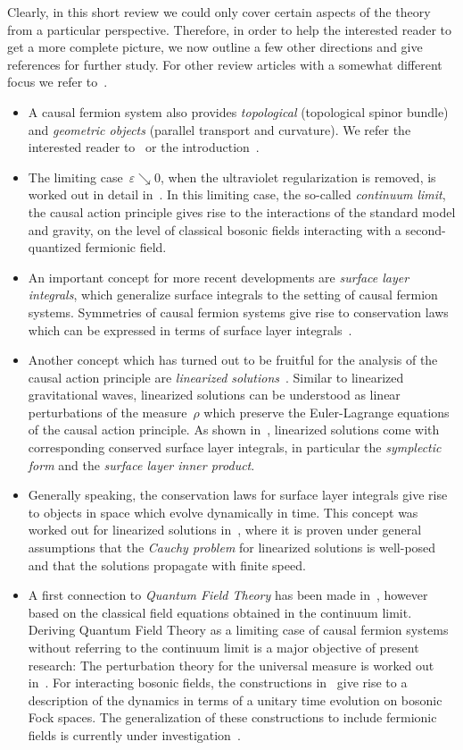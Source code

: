 \documentclass[reqno,11pt]{amsart}
\numberwithin{equation}{section}
\newcommand{\1}{\mbox{\rm 1 \hspace{-1.05 em} 1}}
\begin{document}
Clearly, in this short review we could only cover certain aspects of the theory from a particular perspective.
Therefore, in order to help the interested reader to get a more complete picture,
we now outline a few other directions and give references for further study.
For other review articles with a somewhat different focus we refer to~\cite{srev, rrev, dice2014}.
\begin{itemize}[leftmargin=2em]
\item[(a)] A causal fermion system also provides {\em{topological}} (topological spinor bundle)
and {\em{geometric objects}} (parallel transport and curvature). We refer the interested reader
to~\cite{lqg, topology} or the introduction~\cite{nrstg}.
\item[(b)] The limiting case~$\varepsilon \searrow 0$, when the ultraviolet regularization is removed,
is worked out in detail in~\cite{cfs}. In this limiting case, the so-called {\em{continuum limit}},
the causal action principle gives rise to
the interactions of the standard model and gravity, on the level of classical bosonic fields
interacting with a second-quantized fermionic field.
\item[(c)] An important concept for more recent developments are {\em{surface layer integrals}},
which generalize surface integrals to the setting of causal fermion systems.
Symmetries of causal fermion systems give rise to conservation laws which can be expressed
in terms of surface layer integrals~\cite{noether}.
\item[(d)] Another concept which has turned out to be fruitful for the analysis of the causal
action principle are {\em{linearized solutions}}~\cite{jet}. Similar to linearized gravitational waves,
linearized solutions can be understood as linear perturbations of the measure~$\rho$ which
preserve the Euler-Lagrange equations of the causal action principle.
As shown in~\cite{jet, osi}, linearized solutions come with corresponding conserved
surface layer integrals, in particular the {\em{symplectic form}} and the {\em{surface layer inner product}}.
\item[(e)] Generally speaking, the conservation laws for surface layer integrals give rise to
objects in space which evolve dynamically in time.
This concept was worked out for linearized solutions in~\cite{linhyp}, where it is proven
under general assumptions that the {\em{Cauchy problem}} for linearized solutions is well-posed
and that the solutions propagate with finite speed.
\item[(f)] A first connection to {\em{Quantum Field Theory}} has been made in~\cite{qft},
however based on the classical field equations obtained in the continuum limit.
Deriving Quantum Field Theory as a limiting case of causal fermion systems
without referring to the continuum limit is a major objective of present research:
The perturbation theory for the universal measure is worked out in~\cite{perturb}.
For interacting bosonic fields, the constructions in~\cite{fockbosonic}
give rise to a description of the dynamics in terms of a unitary time evolution on bosonic Fock spaces.
The generalization of these constructions to include fermionic fields is currently under investigation~\cite{fockfermionic}.
\end{itemize}
\end{document}
